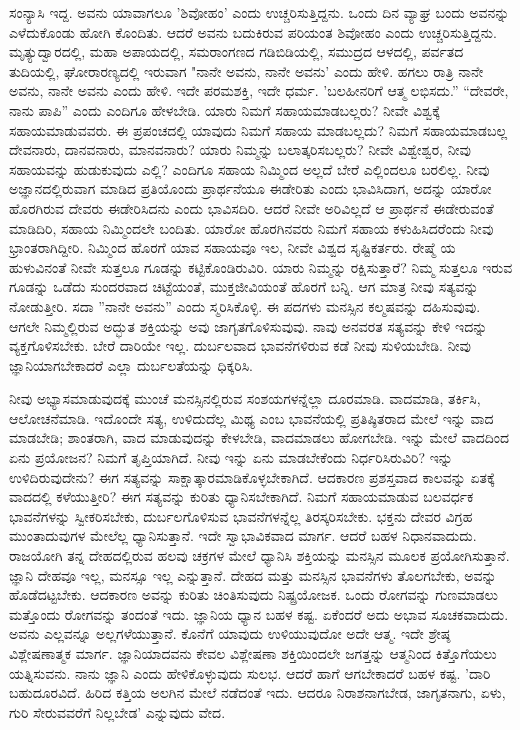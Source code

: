 ಸಂನ್ಯಾಸಿ ಇದ್ದ. ಅವನು ಯಾವಾಗಲೂ 'ಶಿವೋಹಂ' ಎಂದು ಉಚ್ಚರಿಸುತ್ತಿದ್ದನು. ಒಂದು ದಿನ ವ್ಯಾಘ್ರ ಬಂದು ಅವನನ್ನು ಎಳೆದುಕೊಂಡು ಹೋಗಿ ಕೊಂದಿತು. ಆದರೆ ಅವನು ಬದುಕಿರುವ ಪರಿಯಂತ ಶಿವೋಹಂ ಎಂದು ಉಚ್ಚರಿಸುತ್ತಿದ್ದನು. ಮೃತ್ಯುದ್ವಾರದಲ್ಲಿ, ಮಹಾ ಅಪಾಯದಲ್ಲಿ, ಸಮರಾಂಗಣದ ಗಡಿಬಿಡಿಯಲ್ಲಿ, ಸಮುದ್ರದ ಆಳದಲ್ಲಿ, ಪರ್ವತದ ತುದಿಯಲ್ಲಿ, ಘೋರಾರಣ್ಯದಲ್ಲಿ ಇರುವಾಗ "ನಾನೇ ಅವನು, ನಾನೇ ಅವನು' ಎಂದು ಹೇಳಿ. ಹಗಲು ರಾತ್ರಿ ನಾನೇ ಅವನು, ನಾನೇ ಅವನು ಎಂದು ಹೇಳಿ. ಇದೇ ಪರಮಶಕ್ತಿ, ಇದೇ ಧರ್ಮ. 'ಬಲಹೀನರಿಗೆ ಆತ್ಮ ಲಭಿಸದು.” “ದೇವರೇ, ನಾನು ಪಾಪಿ'' ಎಂದು ಎಂದಿಗೂ ಹೇಳಬೇಡಿ. ಯಾರು ನಿಮಗೆ ಸಹಾಯಮಾಡಬಲ್ಲರು? ನೀವೇ ವಿಶ್ವಕ್ಕೆ ಸಹಾಯಮಾಡುವವರು. ಈ ಪ್ರಪಂಚದಲ್ಲಿ ಯಾವುದು ನಿಮಗೆ ಸಹಾಯ ಮಾಡಬಲ್ಲದು? ನಿಮಗೆ ಸಹಾಯಮಾಡಬಲ್ಲ ದೇವನಾರು, ದಾನವನಾರು, ಮಾನವನಾರು? ಯಾರು ನಿಮ್ಮನ್ನು ಬಲಾತ್ಕರಿಸಬಲ್ಲರು? ನೀವೇ ವಿಶ್ವೇಶ್ವರ, ನೀವು ಸಹಾಯವನ್ನು ಹುಡುಕುವುದು ಎಲ್ಲಿ? ಎಂದಿಗೂ ಸಹಾಯ ನಿಮ್ಮಿಂದ ಅಲ್ಲದೆ ಬೇರೆ ಎಲ್ಲಿಂದಲೂ ಬರಲಿಲ್ಲ. ನೀವು ಅಜ್ಞಾನದಲ್ಲಿರುವಾಗ ಮಾಡಿದ ಪ್ರತಿಯೊಂದು ಪ್ರಾರ್ಥನೆಯೂ ಈಡೇರಿತು ಎಂದು ಭಾವಿಸಿದಾಗ, ಅದನ್ನು ಯಾರೋ ಹೊರಗಿರುವ ದೇವರು ಈಡೇರಿಸಿದನು ಎಂದು ಭಾವಿಸದಿರಿ. ಆದರೆ ನೀವೇ ಅರಿವಿಲ್ಲದೆ ಆ ಪ್ರಾರ್ಥನೆ ಈಡೇರುವಂತೆ ಮಾಡಿದಿರಿ, ಸಹಾಯ ನಿಮ್ಮಿಂದಲೇ ಬಂದಿತು. ಯಾರೋ ಹೊರಗಿನವರು ನಿಮಗೆ ಸಹಾಯ ಕಳುಹಿಸಿದರೆಂದು ನೀವು ಭ್ರಾಂತರಾಗಿದ್ದೀರಿ. ನಿಮ್ಮಿಂದ ಹೊರಗೆ ಯಾವ ಸಹಾಯವೂ ಇಲ, ನೀವೇ ವಿಶ್ವದ ಸೃಷ್ಟಿಕರ್ತರು. ರೇಷ್ಮೆ ಯ ಹುಳುವಿನಂತೆ ನೀವೇ ಸುತ್ತಲೂ ಗೂಡನ್ನು ಕಟ್ಟಿಕೊಂಡಿರುವಿರಿ. ಯಾರು ನಿಮ್ಮನ್ನು ರಕ್ಷಿಸುತ್ತಾರೆ? ನಿಮ್ಮ ಸುತ್ತಲೂ ಇರುವ ಗೂಡನ್ನು ಒಡೆದು ಸುಂದರವಾದ ಚಿಟ್ಟೆಯಂತೆ, ಮುಕ್ತಜೀವಿಯಂತೆ ಹೊರಗೆ ಬನ್ನಿ. ಆಗ ಮಾತ್ರ ನೀವು ಸತ್ಯವನ್ನು ನೋಡುತ್ತೀರಿ. ಸದಾ ''ನಾನೇ ಅವನು” ಎಂದು ಸ್ಮರಿಸಿಕೊಳ್ಳಿ. ಈ ಪದಗಳು ಮನಸ್ಸಿನ ಕಲ್ಮಷವನ್ನು ದಹಿಸುವುವು. ಆಗಲೇ ನಿಮ್ಮಲ್ಲಿರುವ ಅದ್ಭುತ ಶಕ್ತಿಯನ್ನು ಅವು ಜಾಗೃತಗೊಳಿಸುವುವು. ನಾವು ಅನವರತ ಸತ್ಯವನ್ನು ಕೇಳಿ ಇದನ್ನು ವ್ಯಕ್ತಗೊಳಿಸಬೇಕು. ಬೇರೆ ದಾರಿಯೇ ಇಲ್ಲ. ದುರ್ಬಲವಾದ ಭಾವನೆಗಳಿರುವ ಕಡೆ ನೀವು ಸುಳಿಯಬೇಡಿ. ನೀವು ಜ್ಞಾನಿಯಾಗಬೇಕಾದರೆ ಎಲ್ಲಾ ದುರ್ಬಲತೆಯನ್ನು ಧಿಕ್ಕರಿಸಿ.

ನೀವು ಅಭ್ಯಾಸಮಾಡುವುದಕ್ಕೆ ಮುಂಚೆ ಮನಸ್ಸಿನಲ್ಲಿರುವ ಸಂಶಯಗಳನ್ನೆಲ್ಲಾ ದೂರಮಾಡಿ. ವಾದಮಾಡಿ, ತರ್ಕಿಸಿ, ಆಲೋಚನೆಮಾಡಿ. ಇದೊಂದೇ ಸತ್ಯ, ಉಳಿದುದೆಲ್ಲ ಮಿಥ್ಯ ಎಂಬ ಭಾವನೆಯಲ್ಲಿ ಪ್ರತಿಷ್ಠಿತರಾದ ಮೇಲೆ ಇನ್ನು ವಾದ ಮಾಡಬೇಡಿ; ಶಾಂತರಾಗಿ, ವಾದ ಮಾಡುವುದನ್ನು ಕೇಳಬೇಡಿ, ವಾದಮಾಡಲು ಹೋಗಬೇಡಿ. ಇನ್ನು ಮೇಲೆ ವಾದದಿಂದ ಏನು ಪ್ರಯೋಜನ? ನಿಮಗೆ ತೃಪ್ತಿಯಾಗಿದೆ. ನೀವು ಇನ್ನು ಏನು ಮಾಡಬೇಕೆಂದು ನಿರ್ಧರಿಸಿರುವಿರಿ? ಇನ್ನು ಉಳಿದಿರುವುದೇನು? ಈಗ ಸತ್ಯವನ್ನು ಸಾಕ್ಷಾತ್ಕಾರಮಾಡಿಕೊಳ್ಳಬೇಕಾಗಿದೆ. ಆದಕಾರಣ ಪ್ರಶಸ್ತವಾದ ಕಾಲವನ್ನು ಏತಕ್ಕೆ ವಾದದಲ್ಲಿ ಕಳೆಯುತ್ತೀರಿ? ಈಗ ಸತ್ಯವನ್ನು ಕುರಿತು ಧ್ಯಾನಿಸಬೇಕಾಗಿದೆ. ನಿಮಗೆ ಸಹಾಯಮಾಡುವ ಬಲವರ್ಧಕ ಭಾವನೆಗಳನ್ನು ಸ್ವೀಕರಿಸಬೇಕು, ದುರ್ಬಲಗೊಳಿಸುವ ಭಾವನೆಗಳನ್ನೆಲ್ಲ ತಿರಸ್ಕರಿಸಬೇಕು. ಭಕ್ತನು ದೇವರ ವಿಗ್ರಹ ಮುಂತಾದುವುಗಳ ಮೇಲೆಲ್ಲ ಧ್ಯಾನಿಸುತ್ತಾನೆ. ಇದೇ ಸ್ವಾಭಾವಿಕವಾದ ಮಾರ್ಗ. ಆದರೆ ಬಹಳ ನಿಧಾನವಾದುದು. ರಾಜಯೋಗಿ ತನ್ನ ದೇಹದಲ್ಲಿರುವ ಹಲವು ಚಕ್ರಗಳ ಮೇಲೆ ಧ್ಯಾನಿಸಿ ಶಕ್ತಿಯನ್ನು ಮನಸ್ಸಿನ ಮೂಲಕ ಪ್ರಯೋಗಿಸುತ್ತಾನೆ. ಜ್ಞಾನಿ ದೇಹವೂ ಇಲ್ಲ, ಮನಸ್ಸೂ ಇಲ್ಲ ಎನ್ನುತ್ತಾನೆ. ದೇಹದ ಮತ್ತು ಮನಸ್ಸಿನ ಭಾವನೆಗಳು ತೊಲಗಬೇಕು, ಅವನ್ನು ಹೊಡೆದಟ್ಟಬೇಕು. ಆದಕಾರಣ ಅವನ್ನು ಕುರಿತು ಚಿಂತಿಸುವುದು ನಿಷ್ಪ್ರಯೋಜಕ. ಒಂದು ರೋಗವನ್ನು ಗುಣಮಾಡಲು ಮತ್ತೊಂದು ರೋಗವನ್ನು ತಂದಂತೆ ಇದು. ಜ್ಞಾನಿಯ ಧ್ಯಾನ ಬಹಳ ಕಷ್ಟ. ಏಕೆಂದರೆ ಅದು ಅಭಾವ ಸೂಚಕವಾದುದು. ಅವನು ಎಲ್ಲವನ್ನೂ ಅಲ್ಲಗಳೆಯುತ್ತಾನೆ. ಕೊನೆಗೆ ಯಾವುದು ಉಳಿಯುವುದೋ ಅದೇ ಆತ್ಮ. ಇದೇ ಶ್ರೇಷ್ಠ ವಿಶ್ಲೇಷಣಾತ್ಮಕ ಮಾರ್ಗ. ಜ್ಞಾನಿಯಾದವನು ಕೇವಲ ವಿಶ್ಲೇಷಣಾ ಶಕ್ತಿಯಿಂದಲೇ ಜಗತ್ತನ್ನು ಆತ್ಮನಿಂದ ಕಿತ್ತೊಗೆಯಲು ಯತ್ನಿಸುವನು. ನಾನು ಜ್ಞಾನಿ ಎಂದು ಹೇಳಿಕೊಳ್ಳುವುದು ಸುಲಭ. ಆದರೆ ಹಾಗೆ ಆಗಬೇಕಾದರೆ ಬಹಳ ಕಷ್ಟ. 'ದಾರಿ ಬಹುದೂರವಿದೆ. ಹಿರಿದ ಕತ್ತಿಯ ಅಲಗಿನ ಮೇಲೆ ನಡೆದಂತೆ ಇದು. ಆದರೂ ನಿರಾಶನಾಗಬೇಡ, ಜಾಗೃತನಾಗು, ಏಳು, ಗುರಿ ಸೇರುವವರೆಗೆ ನಿಲ್ಲಬೇಡ' ಎನ್ನುವುದು ವೇದ.

